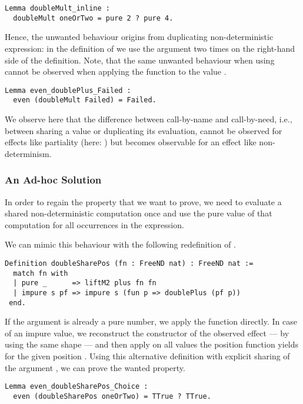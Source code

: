 \begin{verbatim}
Lemma doubleMult_inline :
  doubleMult oneOrTwo = pure 2 ? pure 4.
\end{verbatim}

Hence, the unwanted behaviour origins from duplicating non-deterministic expression: in the definition of  we use the argument  two times on the right-hand side of the definition.
Note, that the same unwanted behaviour when using  cannot be observed when applying the function to the value .

\begin{verbatim}
Lemma even_doublePlus_Failed :
  even (doubleMult Failed) = Failed.
\end{verbatim}

We observe here that the difference between call-by-name and call-by-need, i.e., between sharing a value or duplicating its evaluation, cannot be observed for effects like partiality (here: ) but becomes observable for an effect like non-determinism.

\subsubsection{An Ad-hoc Solution}

In order to regain the property that we want to prove, we need to evaluate a shared non-deterministic computation once and use the pure value of that computation for all occurrences in the expression.

We can mimic this behaviour with the following redefinition of .

\begin{verbatim}
Definition doubleSharePos (fn : FreeND nat) : FreeND nat :=
  match fn with
  | pure _      => liftM2 plus fn fn
  | impure s pf => impure s (fun p => doublePlus (pf p))
 end.
\end{verbatim}

If the argument  is already a pure number, we apply the function  directly.
In case of an impure value, we reconstruct the constructor of the observed effect --- by using the same shape  --- and then apply  on all values the position function  yields for the given position .
Using this alternative definition with explicit sharing of the argument , we can prove the wanted property.

\begin{verbatim}
Lemma even_doubleSharePos_Choice :
  even (doubleSharePos oneOrTwo) = TTrue ? TTrue.
\end{verbatim}

